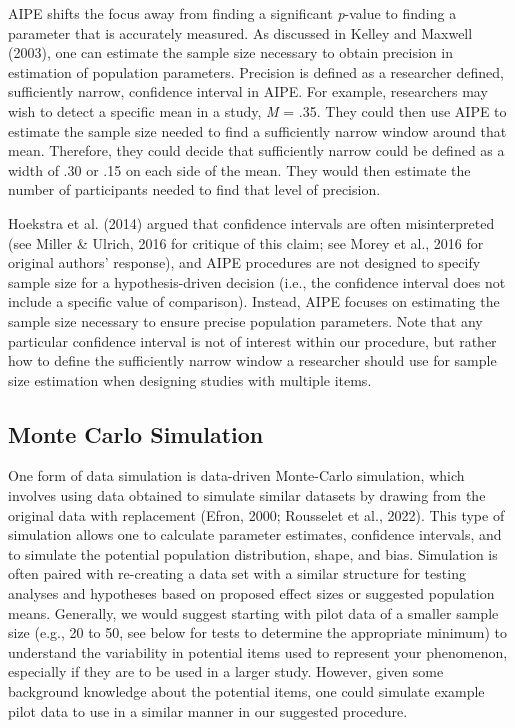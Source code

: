 \documentclass[
  man]{apa7}
\begin{document}
AIPE shifts the focus away from finding a significant \emph{p}-value to finding a parameter that is accurately measured. As discussed in Kelley and Maxwell (2003), one can estimate the sample size necessary to obtain precision in estimation of population parameters. Precision is defined as a researcher defined, sufficiently narrow, confidence interval in AIPE. For example, researchers may wish to detect a specific mean in a study, \emph{M} = .35. They could then use AIPE to estimate the sample size needed to find a sufficiently narrow window around that mean. Therefore, they could decide that sufficiently narrow could be defined as a width of .30 or .15 on each side of the mean. They would then estimate the number of participants needed to find that level of precision.

Hoekstra et al. (2014) argued that confidence intervals are often misinterpreted (see Miller \& Ulrich, 2016 for critique of this claim; see Morey et al., 2016 for original authors' response), and AIPE procedures are not designed to specify sample size for a hypothesis-driven decision (i.e., the confidence interval does not include a specific value of comparison). Instead, AIPE focuses on estimating the sample size necessary to ensure precise population parameters. Note that any particular confidence interval is not of interest within our procedure, but rather how to define the sufficiently narrow window a researcher should use for sample size estimation when designing studies with multiple items.

\subsection{Monte Carlo Simulation}\label{monte-carlo-simulation}

One form of data simulation is data-driven Monte-Carlo simulation, which involves using data obtained to simulate similar datasets by drawing from the original data with replacement (Efron, 2000; Rousselet et al., 2022). This type of simulation allows one to calculate parameter estimates, confidence intervals, and to simulate the potential population distribution, shape, and bias. Simulation is often paired with re-creating a data set with a similar structure for testing analyses and hypotheses based on proposed effect sizes or suggested population means. Generally, we would suggest starting with pilot data of a smaller sample size (e.g., 20 to 50, see below for tests to determine the appropriate minimum) to understand the variability in potential items used to represent your phenomenon, especially if they are to be used in a larger study. However, given some background knowledge about the potential items, one could simulate example pilot data to use in a similar manner in our suggested procedure.
\end{document}
